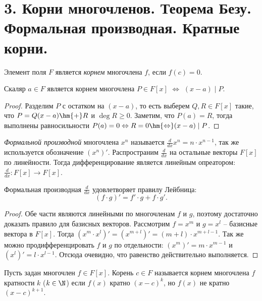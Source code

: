 \section{3. Корни многочленов. Теорема Безу. Формальная производная. Кратные корни.}

\begin{definition}
    Элемент поля $F$ является \textit{корнем} многочлена $f$, если $f(c) = 0$.
\end{definition}

\begin{theorem}[Безу]
    Скаляр $a \in F$ является корнем многочлена $P \in F[x]$ $\Leftrightarrow$ $(x - a)\mid P$.
\end{theorem}

\begin{proof}
    Разделим $P$ с остатком на $(x - a)$, то есть выберем $Q, R \in F[x]$ такие, что $P = Q(x - a) \hm{+} R$ и $\deg{R} \ge 0$. Заметим, что $P(a) = R$, тогда выполнены равносильности $P(a) = 0 \Leftrightarrow R = 0 \hm{\Leftrightarrow} (x - a)\mid P$.
\end{proof}

\begin{definition}
    \textit{Формальной производной} многочлена $x^n$ называется $\frac{d}{dx} x^n = n \cdot x^{n-1}$, так же используется обозначение $(x^n)'$. Распространим $\frac{d}{dx}$ на остальные векторы $F[x]$ по линейности. Тогда дифференцирование является линейным опреатором: $\frac{d}{dx}: F[x] \to F[x]$.
\end{definition}

\begin{proposition}
    Формальная производная $\frac{d}{dx}$ удовлетворяет правилу Лейбница: 
    $$(f \cdot g)' = f' \cdot g + f \cdot g'.$$
\end{proposition}

\begin{proof}
    Обе части являются линейными по многочленам $f$ и $g$, поэтому достаточно доказать правило для базисных векторов. Рассмотрим $f = x^m$ и $g = x^l$ -- базисные вектора в $F[x]$. Тогда $(x^m \cdot x^l)' = (x^{m+l})' = (m+l) \cdot x^{m+l-1}$. Так же можно продифференцировать $f$ и $g$ по отдельности: $(x^m)' = m \cdot x^{m-1}$ и $(x^l)' = l \cdot x^{l-1}$. Отсюда очевидно, что равенство действительно выполняется.
\end{proof}

\begin{definition}
    Пусть задан многочлен $f \in F[x]$. Корень $c \in F$ называется корнем многочлена $f$ кратности $k$ ($k\in \N$) если $f(x)$ кратно $(x-c)^k$, но $f(x)$ не кратно $(x-c)^{k+1}$.
\end{definition}

